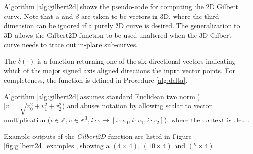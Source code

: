 Algorithm \ref{alg:gilbert2d} shows the pseudo-code for computing the 2D Gilbert curve.
Note that $\alpha$ and $\beta$ are taken to be vectors in 3D, where the third dimension
can be ignored if a purely 2D curve is desired.
The generalization to 3D allows the Gilbert2D function to be used unaltered when the
3D Gilbert curve needs to trace out in-plane sub-curves.


The $\delta(\cdot)$ is a function returning one of the six directional vectors indicating which of
the major signed axis aligned directions the input vector points.
For completeness, the function is defined in Procedure \ref{alg:delta}.

Algorithm \ref{alg:gilbert2d} assumes standard Euclidean two norm ($|v| = \sqrt{v_0^2 + v_1^2 + v_2^2}$)
and abuses notation by allowing scalar to vector multiplication ($i \in \mathbb{Z}, v \in \mathbb{Z}^3, i \cdot v \to [ i \cdot v_0, i \cdot v_1, i \cdot v_2 ]$).
where the context is clear.

Example outputs of the \textit{Gilbert2D} function are listed in Figure \ref{fig:gilbert2d_examples}, showing a $(4 \times 4)$, $(10 \times 4)$ and $(7 \times 4)$


